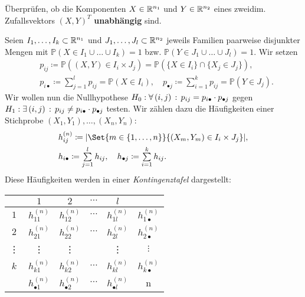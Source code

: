 \documentclass{cheat-sheet}
\renewcommand{\P}{\mathbb{P}} %
\newcommand{\testh}[1]{\textcolor{TestColor}{\textbf{#1}}}
\begin{document}
\begin{ziel}
  Überprüfen, ob die Komponenten $X \in \mathbb{R}^{n_1}$ und $Y \in \mathbb{R}^{n_2}$ eines zweidim. Zufallsvektors $(X, Y)^T$ \testh{unabhängig} sind.
\end{ziel}

\begin{verf}
  Seien $I_1, \ldots, I_k \subset \mathbb{R}^{n_1}$ und $J_1, \ldots, J_l \subset \mathbb{R}^{n_2}$ jeweils Familien paarweise disjunkter Mengen mit $\P(X \in I_1 \cup \ldots \cup I_k) = 1$ bzw. $\P(Y \in J_1 \cup \ldots \cup J_l) = 1$.
  Wir setzen
  \begin{align*}
    & p_{ij} \coloneqq \P((X, Y) \in I_i \times J_j) = \P(\{ X \in I_i \} \cap \{ X_j \in J_j \}), \\
    & p_{i\bullet} \coloneqq \sum_{j=1}^l p_{ij} = \P(X \in I_i), \quad
    p_{\bullet j} \coloneqq \sum_{i=1}^k p_{ij} = \P(Y \in J_j).
  \end{align*}
  Wir wollen nun die Nullhypothese $H_0 : \forall \, {(i, j)} \,:\, p_{ij} = p_{i \bullet} \cdot p_{\bullet j}$ gegen $H_1 : \exists \, {(i,j)} \,:\, p_{ij} \neq p_{i \bullet} \cdot p_{\bullet j}$ testen.
  Wir zählen dazu die Häufigkeiten einer Stichprobe $(X_1, Y_1), \ldots, (X_n, Y_n)$:
  \begin{align*}
    & h_{ij}^{(n)} \coloneqq \abs{\Set{m \in \{ 1, \ldots, n \}}{(X_m, Y_m) \in I_i \times J_j}}, \\
    & h_{i \bullet} \coloneqq \sum_{j=1}^l h_{ij}, \quad
    h_{\bullet j} \coloneqq \sum_{i=1}^k h_{ij}.
  \end{align*}
  Diese Häufigkeiten werden in einer \emph{Kontingenztafel} dargestellt:
  \begin{center}
    \renewcommand{\arraystretch}{1.5}
    \begin{tabular}{c | c c c c | c}
      & $1$ & $2$ & $\cdots$ & $l$ & \\ \hline
      $1$ & $h_{11}^{(n)}$ & $h_{12}^{(n)}$ & $\cdots$ & $h_{1l}^{(n)}$ & $h_{1 \bullet}^{(n)}$ \\
      $2$ & $h_{21}^{(n)}$ & $h_{22}^{(n)}$ & $\cdots$ & $h_{2l}^{(n)}$ & $h_{2 \bullet}^{(n)}$ \\
      \vdots & \vdots & \vdots & & \vdots & $\vdots$ \\
      $k$ & $h_{k1}^{(n)}$ & $h_{k2}^{(n)}$ & $\cdots$ & $h_{kl}^{(n)}$ & $h_{k \bullet}^{(n)}$ \\ \hline
      & $h_{\bullet 1}^{(n)}$ & $h_{\bullet 2}^{(n)}$ & $\cdots$ & $h_{\bullet l}^{(n)}$ & n
    \end{tabular}
  \end{center}

\end{verf}
\end{document}
